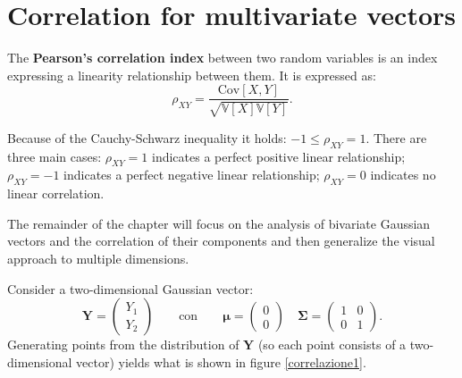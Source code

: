 \newpage

\section{Correlation for multivariate vectors} \label{sezioneCorrelazione}


\begin{defi}
The \textbf{Pearson's correlation index} between two random variables is an index expressing a linearity relationship between them. It is expressed as:
\[ \rho_{XY}=\frac{\text{Cov}[X,Y]}{\sqrt{\mathbb{V}[X]\mathbb{V}[Y]}}.
\]
\end{defi}
\begin{oss}
    Because of the Cauchy-Schwarz inequality it holds: $-1\leq \rho_{XY}=1$. There are three main cases: $\rho_{XY}=1$ indicates a perfect positive linear relationship; $\rho_{XY}=-1$ indicates a perfect negative linear relationship; $\rho_{XY}=0$ indicates no linear correlation. 
\end{oss}

The remainder of the chapter will focus on the analysis of bivariate Gaussian vectors and the correlation of their components and then generalize the visual approach to multiple dimensions.

Consider a two-dimensional Gaussian vector: \[\mathbf{Y}=\begin{pmatrix}Y_1\\Y_2\end{pmatrix} \qquad\text{con} \qquad \bm{\mu} = \begin{pmatrix}0\\0\end{pmatrix} \quad \mathbf{\Sigma}=\begin{pmatrix}1&0\\0&1\end{pmatrix}.
\]
Generating points from the distribution of $\mathbf{Y}$ (so each point consists of a two-dimensional vector) yields what is shown in figure \ref{correlazione1}.

